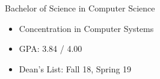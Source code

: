 %
%
%


\begin{projects}

    {Bachelor of Science in Computer Science}
    {
    \begin{itemize}
        \item Concentration in Computer Systems
        \item GPA: 3.84 / 4.00
        \item Dean's List: Fall 18, Spring 19
	\end{itemize}
    }

\end{projects}
